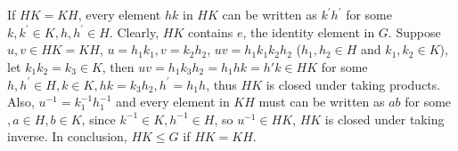 \documentclass[12pt]{article}
\begin{document}
\subsection{}
\subsection{}
\subsection{}

\section{}
\subsection{}
\subsection{}
\subsection{}
If $HK=KH$, every element $hk$ in $HK$ can be written as $k^{'}h^{'}$ for some $k,k^{'}\in K,h,h^{'}\in H$. Clearly, $HK$ contains $e$, the identity element in $G$. Suppose $u,v\in HK=KH$, $u=h_1k_1, v=k_2h_2$, $uv=h_1k_1k_2h_2$ ($h_1,h_2\in H$ and $k_1,k_2\in K$), let $k_1k_2=k_3\in K$, then $uv=h_1k_3h_2=h_1hk=h'k\in HK$ for some $h,h^{'}\in H, k\in K,hk=k_3h_2, h^{'}=h_1h$, thus $HK$ is closed under taking products. Also, $u^{-1}=k_1^{-1}h_1^{-1}$ and every element in $KH$ must can be written as $ab$ for some $,a\in H,b\in K$, since $k^{-1}\in K,h^{-1}\in H$, so $u^{-1}\in HK$, $HK$ is closed under taking inverse. In conclusion, $HK\le G$ if $HK=KH$.

\subsection{}

\section{}
\end{document}
